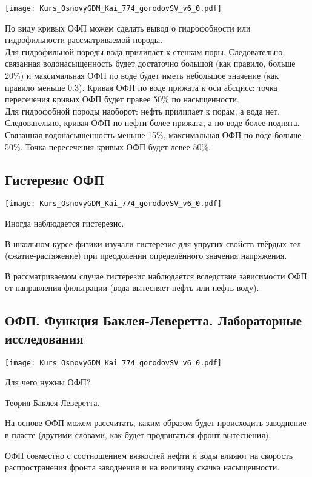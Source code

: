 \documentclass[main.tex]{subfiles}
\begin{document}
\texttt{[image: Kurs\_OsnovyGDM\_Kai\_774\_gorodovSV\_v6\_0.pdf]}

По виду кривых ОФП можем сделать вывод о гидрофобности или гидрофильности рассматриваемой породы.
\\

Для гидрофильной породы вода прилипает к стенкам поры. Следовательно, связанная водонасыщенность будет достаточно большой (как правило, больше 20\%) и максимальная ОФП по воде будет иметь небольшое значение (как правило меньше 0.3).
Кривая ОФП по воде прижата к оси абсцисс: точка пересечения кривых ОФП будет правее 50\% по насыщенности.
\\

Для гидрофобной породы наоборот: нефть прилипает к порам, а вода нет. Следовательно, кривая ОФП по нефти более прижата, а по воде более поднята.
Связанная водонасыщенность меньше 15\%, максимальная ОФП по воде больше 50\%. Точка пересечения кривых ОФП будет левее 50\%.

\subsection{Гистерезис ОФП}

\texttt{[image: Kurs\_OsnovyGDM\_Kai\_774\_gorodovSV\_v6\_0.pdf]}

Иногда наблюдается гистерезис.

В школьном курсе физики изучали гистерезис для упругих свойств твёрдых тел (сжатие-растяжение) при преодолении определённого значения напряжения.

В рассматриваемом случае гистерезис наблюдается вследствие зависимости ОФП от направления фильтрации (вода вытесняет нефть или нефть воду).

\subsection{ОФП. Функция Баклея-Леверетта. Лабораторные исследования}

\texttt{[image: Kurs\_OsnovyGDM\_Kai\_774\_gorodovSV\_v6\_0.pdf]}

Для чего нужны ОФП?

Теория Баклея-Леверетта.

На основе ОФП можем рассчитать, каким образом будет происходить заводнение в пласте  (другими словами, как будет продвигаться фронт вытеснения).

ОФП совместно с соотношением вязкостей нефти и воды влияют на скорость распространения фронта заводнения и на величину скачка насыщенности.
\end{document}
